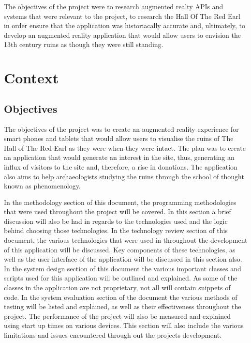 The objectives of the project were to research augmented realty APIs and systems that were relevant to the project, to research the Hall Of The Red Earl in order ensure that the application was historiacally accurate and, ultimately, to develop an augmented reality application that would allow users to envision the 13th century ruins as though they were still standing. 
\chapter{Context}
\section{Objectives}
The objectives of the project was to create an augmented reality experience for smart phones and tablets that would allow users to visualise the ruins of The Hall of The Red Earl as they were when they were intact.
The plan was to create an application that would generate an interest in the site, thus, generating an influx of visitors to the site and, therefore, a rise in donations.
The application also aims to help archaeologists studying the ruins through the school of thought known as phenomenology.

In the methodology section of this document, the programming methodologies that were used throughout the project will be covered. In this section a brief discussion will also be had in regards to the technologies used and the logic behind choosing those technologies.
In the technology review section of this document,  the various technologies that were used in throughout the development of this application will be discussed. Key components of these technologies, as well as the user interface of the application will be discussed in this section also.
In the system design section of this document the various important classes and scripts used for this application will be outlined and explained. As some of the classes in the application are not proprietary, not all will contain snippets of code.
In the system evaluation section of the document the various methods of testing will be listed and explained, as well as their effectiveness throughout the project. The performance of the project will also be measured and explained using start up times on various devices. This section will also include the various limitations and issues encountered through out the projects development.

